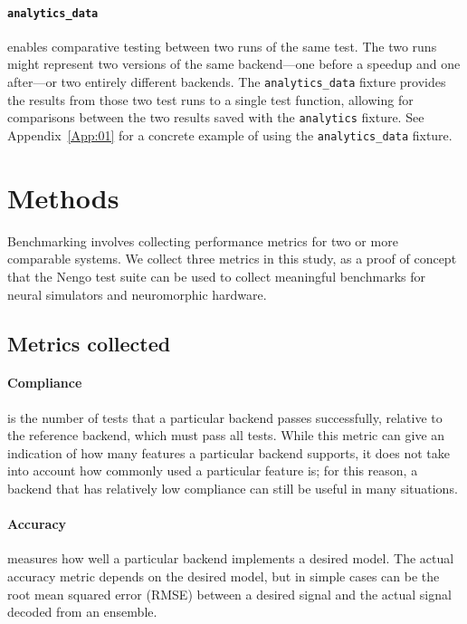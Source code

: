 \documentclass{frontiersSCNS}
\begin{document}
\paragraph{\texttt{analytics\_data}}
enables comparative testing between
two runs of the same test.
The two runs might represent two versions
of the same backend---one before a
speedup and one after---or two
entirely different backends.
The \texttt{analytics\_data} fixture
provides the results from those two
test runs to a single test function,
allowing for comparisons
between the two results saved
with the \texttt{analytics} fixture.
See Appendix~\ref{App:01} for a
concrete example of using the
\texttt{analytics\_data} fixture.

\section{Methods}

Benchmarking involves collecting performance metrics
for two or more comparable systems.
We collect three metrics in this study,
as a proof of concept that the Nengo test suite
can be used to collect meaningful benchmarks
for neural simulators and neuromorphic hardware.

\subsection{Metrics collected}
\label{Sec:Metrics}

\paragraph{Compliance}
is the number of tests that a particular backend
passes successfully, relative to the reference
backend, which must pass all tests.
While this metric can give an indication
of how many features a particular backend supports,
it does not take into account how commonly used
a particular feature is;
for this reason, a backend that has relatively
low compliance can still be useful
in many situations.

\paragraph{Accuracy}
measures how well a particular backend
implements a desired model.
The actual accuracy metric depends
on the desired model,
but in simple cases can be
the root mean squared error (RMSE)
between a desired signal
and the actual signal decoded
from an ensemble.
\end{document}
